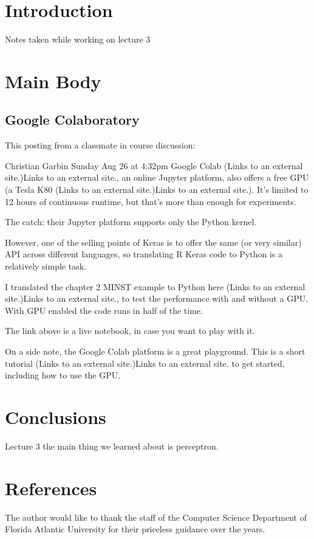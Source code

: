 \section{Introduction}


Notes taken while working on lecture 3

\section{Main Body}
\subsection{Google Colaboratory}
This posting from a classmate in course discussion:

Christian Garbin
Sunday Aug 26 at 4:32pm
Google Colab (Links to an external site.)Links to an external site., an online Jupyter platform, also offers a free GPU (a Tesla K80 (Links to an external site.)Links to an external site.). It's limited to 12 hours of continuous runtime, but that's more than enough for experiments.

The catch: their Jupyter platform supports only the Python kernel.

However, one of the selling points of Keras is to offer the same (or very similar) API across different languages, so translating R Keras code to Python is a relatively simple task.

I translated the chapter 2 MINST example to Python here (Links to an external site.)Links to an external site., to test the performance with and without a GPU. With GPU enabled the code runs in half of the time.

The link above is a live notebook, in case you want to play with it.

On a side note, the Google Colab platform is a great playground. This is a short tutorial (Links to an external site.)Links to an external site. to get started, including how to use the GPU.

\section{Conclusions}

Lecture 3 the main thing we learned about is perceptron.


\section{References}

\begin{acks}
The author would like to thank the staff of the Computer Science Department
of Florida Atlantic University for their priceless guidance over the years.
\end{acks}



